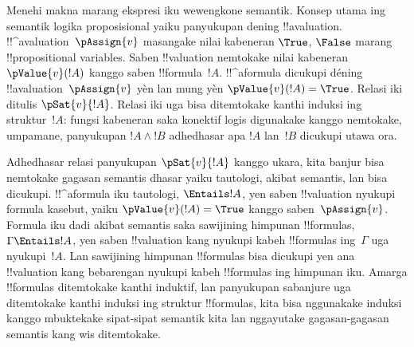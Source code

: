 \documentclass[../../../include/open-logic-section]{subfiles}
\begin{document}
Menehi makna marang ekspresi iku wewengkone semantik. Konsep utama ing
semantik logika proposisional yaiku panyukupan dening !!a{valuation}.
!!^a{valuation}~$\pAssign{v}$ masangake nilai kabeneran $\True$,
$\False$ marang !!{propositional variable}s. Saben !!{valuation}
nemtokake nilai kabeneran $\pValue{v}(!A)$ kanggo saben
!!{formula}~$!A$. !!^a{formula} dicukupi déning !!a{valuation}~$\pAssign{v}$
yèn lan mung yèn $\pValue{v}(!A) = \True$. Relasi iki ditulis
$\pSat{v}{!A}$. Relasi iki uga bisa ditemtokake kanthi induksi ing
struktur~$!A$: fungsi kabeneran saka konektif logis digunakake kanggo
nemtokake, umpamane, panyukupan $!A \land !B$ adhedhasar apa $!A$
lan~$!B$ dicukupi utawa ora.

Adhedhasar relasi panyukupan $\pSat{v}{!A}$ kanggo ukara, kita banjur
bisa nemtokake gagasan semantis dhasar yaiku tautologi, akibat
semantis, lan bisa dicukupi. !!^a{formula} iku tautologi,
$\Entails !A$, yen saben !!{valuation} nyukupi formula kasebut, yaiku
$\pValue{v}(!A) = \True$ kanggo saben~$\pAssign{v}$. Formula iku dadi
akibat semantis saka sawijining himpunan !!{formula}s,
$\Gamma \Entails !A$, yen saben !!{valuation} kang nyukupi kabeh
!!{formula}s ing~$\Gamma$ uga nyukupi~$!A$. Lan sawijining himpunan
!!{formula}s bisa dicukupi yen ana !!{valuation} kang bebarengan
nyukupi kabeh !!{formula}s ing himpunan iku. Amarga !!{formula}s
ditemtokake kanthi induktif, lan panyukupan sabanjure uga ditemtokake
kanthi induksi ing struktur !!{formula}s, kita bisa nggunakake induksi
kanggo mbuktekake sipat-sipat semantik kita lan nggayutake gagasan-gagasan
semantis kang wis ditemtokake.
\end{document}
